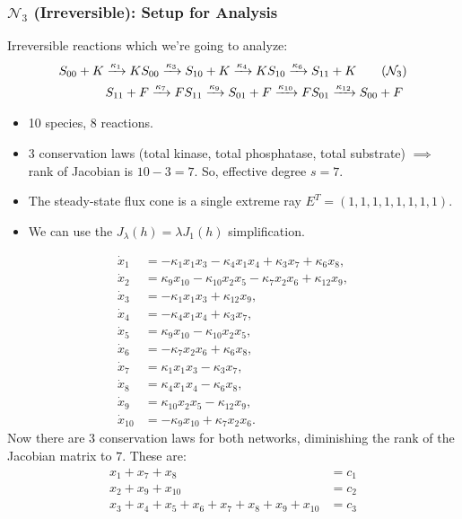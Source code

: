 \documentclass[aspectratio=169]{beamer}
\begin{document}
\begin{frame}{\insertsectionhead}
\frametitle{$\mathcal{N}_3$ (Irreversible): Setup for Analysis}
Irreversible reactions which we're going to analyze:
\begin{align*}
	S_{00} + K \xrightarrow{\kappa_1} KS_{00} \xrightarrow{\kappa_3} S_{10} + K \xrightarrow{\kappa_4} KS_{10} \xrightarrow{\kappa_6} S_{11} + K \tag{$\mathcal{N}_3$}
	\\
	S_{11} + F \xrightarrow{\kappa_7} FS_{11} \xrightarrow{\kappa_9} S_{01} + F \xrightarrow{\kappa_{10}} FS_{01} \xrightarrow{\kappa_{12}} S_{00} + F \ \notag
\end{align*}
\begin{itemize}
	\item 10 species, 8 reactions.
	\item 3 conservation laws (total kinase, total phosphatase, total substrate) $\implies$ rank of Jacobian is $10-3=7$. So, effective degree $s=7$.
	\item The steady-state flux cone is a \alert{single extreme ray} $E^T = (1,1,1,1,1,1,1,1)$.
	\item We can use the $J_\lambda(h) = \lambda J_1(h)$ simplification.
\end{itemize}
\end{frame}

\begin{frame}
\[
	\begin{aligned}
		\dot{x}_{1} &= -\kappa_{1} x_{1} x_{3} - \kappa_{4} x_{1} x_{4} + \kappa_{3} x_{7} + \kappa_{6} x_{8},\\
		\dot{x}_{2} &= \kappa_{9} x_{10} - \kappa_{10} x_{2} x_{5} - \kappa_{7} x_{2} x_{6} + \kappa_{12} x_{9},\\
		\dot{x}_{3} &= -\kappa_{1} x_{1} x_{3} + \kappa_{12} x_{9},\\
		\dot{x}_{4} &= -\kappa_{4} x_{1} x_{4} + \kappa_{3} x_{7},\\
		\dot{x}_{5} &= \kappa_{9} x_{10} - \kappa_{10} x_{2} x_{5},\\
		\dot{x}_{6} &= -\kappa_{7} x_{2} x_{6} + \kappa_{6} x_{8},\\
		\dot{x}_{7} &= \kappa_{1} x_{1} x_{3} - \kappa_{3} x_{7},\\
		\dot{x}_{8} &= \kappa_{4} x_{1} x_{4} - \kappa_{6} x_{8},\\
		\dot{x}_{9} &= \kappa_{10} x_{2} x_{5} - \kappa_{12} x_{9},\\
		\dot{x}_{10} &= -\kappa_{9} x_{10} + \kappa_{7} x_{2} x_{6}.
	\end{aligned}
\]
Now there are 3 conservation laws for both networks, diminishing the rank of the Jacobian matrix to $7$. These are:
\[
	\begin{aligned}
		x_{1}+x_{7}+x_{8}&=c_{1}\\x_{2}+x_{9}+x_{10}&=c_{2}\\x_{3}+x_{4}+x_{5}+x_{6}+x_{7}+x_{8}+x_{9}+x_{10}&=c_{3}
	\end{aligned}
\]
\end{frame}
\end{document}
